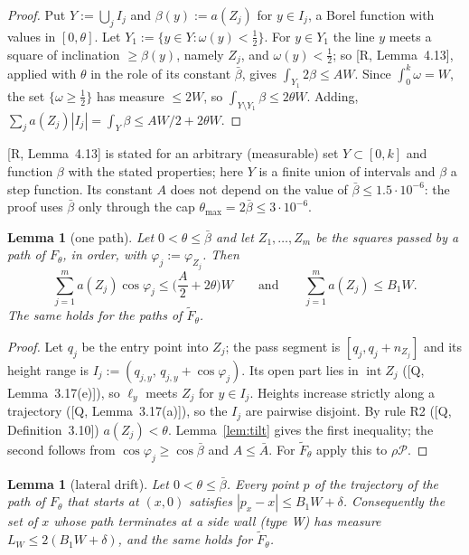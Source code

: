 \documentclass[11pt]{amsart}
\newcommand{\cP}{\mathcal P}
\newcommand{\bbar}{\bar\beta}
\newcommand{\Abar}{\bar A}
\newtheorem{lemma}[theorem]{Lemma}
\theoremstyle{definition}
\theoremstyle{remark}
\numberwithin{equation}{section}
\begin{document}
\begin{proof}
Put $Y:=\bigcup_jI_j$ and $\beta(y):=a(Z_j)$ for $y\in I_j$, a Borel function with values in $[0,\theta]$. Let
$Y_1:=\{y\in Y:\omega(y)<\frac12\}$. For $y\in Y_1$ the line $y$ meets a square of inclination $\ge\beta(y)$, namely
$Z_j$, and $\omega(y)<\frac12$; so [R, Lemma~4.13], applied with $\theta$ in the role of its constant $\bar\beta$, gives
$\int_{Y_1}2\beta\le AW$. Since $\int_0^k\omega=W$, the set $\{\omega\ge\frac12\}$ has measure $\le2W$, so
$\int_{Y\setminus Y_1}\beta\le2\theta W$. Adding, $\sum_ja(Z_j)|I_j|=\int_Y\beta\le AW/2+2\theta W$.
\end{proof}

[R, Lemma~4.13] is stated for an arbitrary (measurable) set $Y\subset[0,k]$ and function $\beta$ with the stated
properties; here $Y$ is a finite union of intervals and $\beta$ a step function. Its constant $A$ does not depend on the
value of $\bar\beta\le1.5\cdot10^{-6}$: the proof uses $\bar\beta$ only through the cap
$\theta_{\max}=2\bar\beta\le3\cdot10^{-6}$.

\begin{lemma}[one path]\label{lem:path}
Let $0<\theta\le\bbar$ and let $Z_1,\dots,Z_m$ be the squares passed by a path of $F_\theta$, in order, with
$\varphi_j:=\varphi_{Z_j}$. Then
\[
\sum_{j=1}^ma(Z_j)\cos\varphi_j\le\Big(\frac A2+2\theta\Big)W\qquad\text{and}\qquad\sum_{j=1}^ma(Z_j)\le B_1W .
\]
The same holds for the paths of $\tilde F_\theta$.
\end{lemma}

\begin{proof}
Let $q_j$ be the entry point into $Z_j$; the pass segment is $[q_j,q_j+n_{Z_j}]$ and its height range is
$I_j:=(q_{j,y},\,q_{j,y}+\cos\varphi_j)$. Its open part lies in $\operatorname{int}Z_j$ ([Q, Lemma~3.17(e)]), so $\ell_y$
meets $Z_j$ for $y\in I_j$. Heights increase strictly along a trajectory ([Q, Lemma~3.17(a)]), so the $I_j$ are pairwise
disjoint. By rule R2 ([Q, Definition~3.10]) $a(Z_j)<\theta$. Lemma~\ref{lem:tilt} gives the first inequality; the second
follows from $\cos\varphi_j\ge\cos\bbar$ and $A\le\Abar$. For $\tilde F_\theta$ apply this to $\rho\cP$.
\end{proof}

\begin{lemma}[lateral drift]\label{lem:drift}
Let $0<\theta\le\bbar$. Every point $p$ of the trajectory of the path of $F_\theta$ that starts at $(x,0)$ satisfies
$|p_x-x|\le B_1W+\delta$. Consequently the set of $x$ whose path terminates at a side wall \textup{(}type W\textup{)}
has measure $L_W\le2(B_1W+\delta)$, and the same holds for $\tilde F_\theta$.
\end{lemma}
\end{document}
